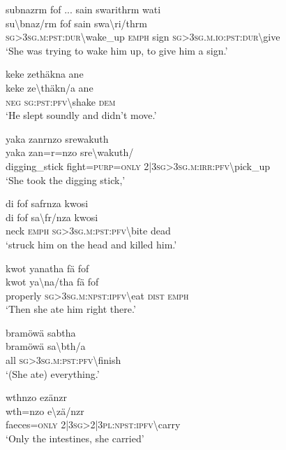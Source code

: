 \ea\label{ex:7:a4754}
subnazrm fof ... sain swarithrm wati\\
\gll su{\textbackslash}bnaz/rm	fof	sain	swa{\textbackslash}ri/thrm\\
     \textsc{sg}>3\textsc{sg}.\textsc{m}:\textsc{pst}:\textsc{dur}{\textbackslash}wake\_up	\textsc{emph}	sign	\textsc{sg}>3\textsc{sg}.\textsc{m}.\textsc{io}:\textsc{pst}:\textsc{dur}{\textbackslash}give\\
\glt `She was trying to wake him up, to give him a sign.'
\z

\ea\label{ex:7:a4756}
keke zethäkna ane\\
\gll keke	ze{\textbackslash}thäkn/a	ane\\
     \textsc{neg}	\textsc{sg}:\textsc{pst}:\textsc{pfv}{\textbackslash}shake	\textsc{dem}\\
\glt `He slept soundly and didn't move.'
\z

\ea\label{ex:7:a4757}
yaka zanrnzo srewakuth\\
\gll yaka	zan=r=nzo	sre{\textbackslash}wakuth/\\
     digging\_stick	fight=\textsc{purp}=\textsc{only}	2|3\textsc{sg}>3\textsc{sg}.\textsc{m}:\textsc{irr}:\textsc{pfv}{\textbackslash}pick\_up\\
\glt `She took the digging stick,'
\z

\ea\label{ex:7:a4758}
di fof safrnza kwosi\\
\gll di	fof	sa{\textbackslash}fr/nza	kwosi\\
     neck	\textsc{emph}	\textsc{sg}>3\textsc{sg}.\textsc{m}:\textsc{pst}:\textsc{pfv}{\textbackslash}bite	dead\\
\glt `struck him on the head and killed him.'
\z

\ea\label{ex:7:a4759}
kwot yanatha fä fof\\
\gll kwot	ya{\textbackslash}na/tha	fä	fof\\
     properly	\textsc{sg}>3\textsc{sg}.\textsc{m}:\textsc{npst}:\textsc{ipfv}{\textbackslash}eat	\textsc{dist}	\textsc{emph}\\
\glt `Then she ate him right there.'
\z

\ea\label{ex:7:a4760}
bramöwä sabtha\\
\gll bramöwä	sa{\textbackslash}bth/a\\
     all	\textsc{sg}>3\textsc{sg}.\textsc{m}:\textsc{pst}:\textsc{pfv}{\textbackslash}finish\\
\glt `(She ate) everything.'
\z

\ea\label{ex:7:a4762}
wthnzo ezänzr\\
\gll wth=nzo	e{\textbackslash}zä/nzr\\
     faeces=\textsc{only}	2|3\textsc{sg}>2|3\textsc{pl}:\textsc{npst}:\textsc{ipfv}{\textbackslash}carry\\
\glt `Only the intestines, she carried'
\z

